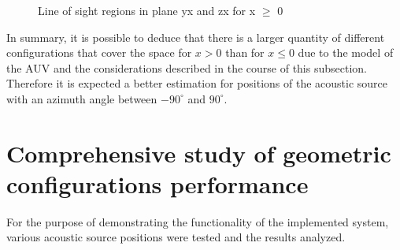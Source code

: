\begin{figure}[!htbp]
	\captionsetup{justification=centering,margin=2cm}
	\caption{Line of sight regions in plane yx and zx for x $\geq$ 0}
	\label{fig:los-color-b0}
\end{figure}

In summary, it is possible to deduce that there is a larger quantity of different configurations that cover the space for $x>0$ than for $x \leq 0$ due to the model of the AUV and the considerations described in the course of this subsection. Therefore it is expected a better estimation for positions of the acoustic source with an azimuth angle between $-90^{\circ}$ and $90^{\circ}$.


\section{Comprehensive study of geometric configurations performance} \label{sec:analysis_config_performance}


For the purpose of demonstrating the functionality of the implemented system, various acoustic source positions were tested and the results analyzed.

